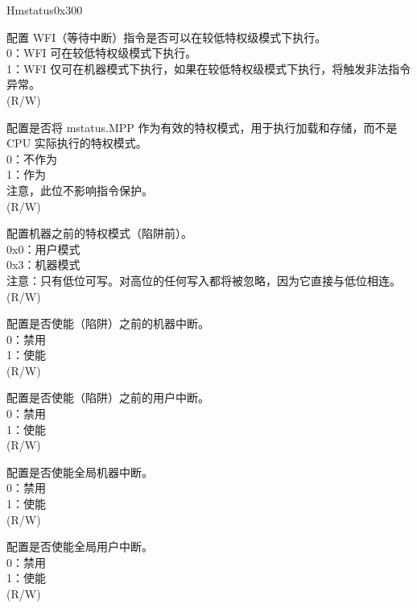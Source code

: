 \begin{register}{H}{mstatus}{0x300}\label{regdesc:MSTATUS}
%
%
%
%
%
%
%
%
%
%
%
%
%
\regnewline%
\begin{regdesc}\begin{reglist}
\label{fielddesc:MSTATUSTW}\item [TW] 配置 WFI（等待中断）指令是否可以在较低特权级模式下执行。\\
0：WFI 可在较低特权级模式下执行。\\
1：WFI 仅可在机器模式下执行，如果在较低特权级模式下执行，将触发非法指令异常。\\
(R/W)
\label{fielddesc:MSTATUS_MPRV}\item [MPRV] 配置是否将 mstatus.MPP 作为有效的特权模式，用于执行加载和存储，而不是 CPU 实际执行的特权模式。\\
0：不作为\\
1：作为\\
注意，此位不影响指令保护。\\
(R/W) \\
\label{fielddesc:MSTATUSMPP}\item [MPP] 配置机器之前的特权模式（陷阱前）。\\
0x0：用户模式\\
0x3：机器模式\\
注意：只有低位可写。对高位的任何写入都将被忽略，因为它直接与低位相连。\\
(R/W)
\label{fielddesc:MSTATUSMPIE}\item [MPIE] 配置是否使能（陷阱）之前的机器中断。\\
0：禁用\\
1：使能\\
(R/W)
\label{fielddesc:MSTATUSUPIE}\item [UPIE] 配置是否使能（陷阱）之前的用户中断。\\
0：禁用\\
1：使能\\
(R/W)
\label{fielddesc:MSTATUSMIE}\item [MIE] 配置是否使能全局机器中断。\\
0：禁用\\
1：使能\\
(R/W)
\label{fielddesc:MSTATUSUIE}\item [UIE] 配置是否使能全局用户中断。\\
0：禁用\\
1：使能\\
(R/W)
\end{reglist}\end{regdesc}
\end{register}

